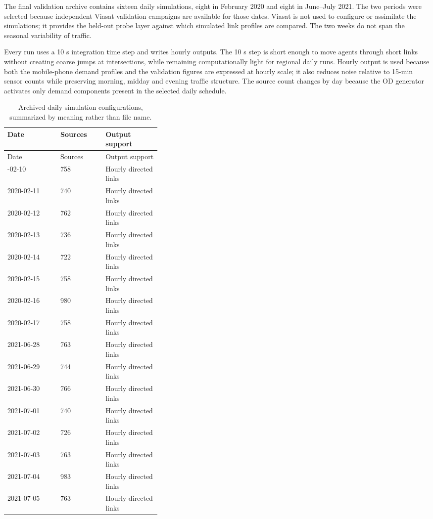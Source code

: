 \documentclass[11pt,a4paper]{article}
\begin{document}
The final validation archive contains sixteen daily simulations, eight in February 2020 and eight in June--July 2021. The two periods were selected because independent Viasat validation campaigns are available for those dates. Viasat is not used to configure or assimilate the simulations; it provides the held-out probe layer against which simulated link profiles are compared. The two weeks do not span the seasonal variability of traffic.

Every run uses a 10 s integration time step and writes hourly outputs. The 10 s step is short enough to move agents through short links without creating coarse jumps at intersections, while remaining computationally light for regional daily runs. Hourly output is used because both the mobile-phone demand profiles and the validation figures are expressed at hourly scale; it also reduces noise relative to 15-min sensor counts while preserving morning, midday and evening traffic structure. The source count changes by day because the OD generator activates only demand components present in the selected daily schedule.

\begin{longtable}{@{}llp{0.36\linewidth}@{}}
\caption{Archived daily simulation configurations, summarized by meaning
rather than file name.}
\label{tab:daily-runs}\\
\toprule
Date & Sources & Output support \\
\midrule
\endfirsthead
\toprule
Date & Sources & Output support \\
\midrule
\endhead
\bottomrule
\endfoot
2020-02-10 & 758 & Hourly directed links \\
2020-02-11 & 740 & Hourly directed links \\
2020-02-12 & 762 & Hourly directed links \\
2020-02-13 & 736 & Hourly directed links \\
2020-02-14 & 722 & Hourly directed links \\
2020-02-15 & 758 & Hourly directed links \\
2020-02-16 & 980 & Hourly directed links \\
2020-02-17 & 758 & Hourly directed links \\
2021-06-28 & 763 & Hourly directed links \\
2021-06-29 & 744 & Hourly directed links \\
2021-06-30 & 766 & Hourly directed links \\
2021-07-01 & 740 & Hourly directed links \\
2021-07-02 & 726 & Hourly directed links \\
2021-07-03 & 763 & Hourly directed links \\
2021-07-04 & 983 & Hourly directed links \\
2021-07-05 & 763 & Hourly directed links \\
\end{longtable}
\end{document}
